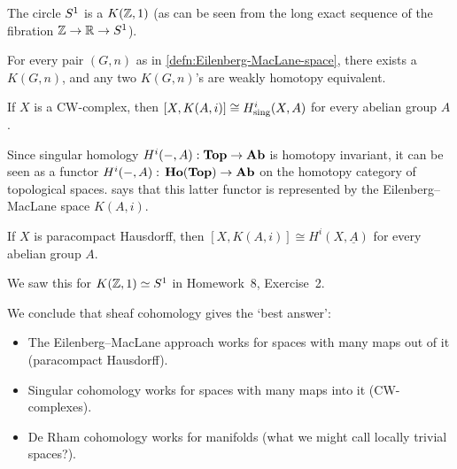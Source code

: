 \begin{exmp}
The circle \(\sphere[1]\) is a \(K(\mathbb{Z},1)\) (as can be seen from the long exact sequence of the fibration \(\bb Z\to\bb R\to\sphere[1]\)).
\end{exmp}

\begin{thm}[name={\cite[Proposition~4.30]{hatcherAlgebraicTopology2002}}]
For every pair \((G,n)\) as in \cref{defn:Eilenberg-MacLane-space}, there exists a \(K(G,n)\), and any two \(K(G,n)\)'s are weakly homotopy equivalent.
\end{thm}

\begin{prop}[name={representability of singular cohomology~\cite[Theorem 4.57]{hatcherAlgebraicTopology2002}}]\label{prop:representability-of-singular-cohomology}
If \(X\) is a CW-complex, then \([X,K(A,i)]\cong H^i_{\smash{\textup{sing}}}(X,A)\) for every abelian group \(A\).
\end{prop}

\begin{rmk}
Since singular homology \(H^i(-,A)\colon\catTopologicalSpace\to\catAbelianGroup\) is homotopy invariant, it can be seen as a functor \(H^i(-,A)\colon\catHomotopy(\catTopologicalSpace)\to\catAbelianGroup\) on the homotopy category of topological spaces.
 says that this latter functor is represented by the Eilenberg--MacLane space \(K(A,i)\).
\end{rmk}

\begin{prop}\label{prop:comparison-sheaf-cohomology-Eilenberg-MacLane}
If \(X\) is paracompact Hausdorff, then \([X,K(A,i)]\cong H^i(X,\underline{A})\) for every abelian group \(A\).
\end{prop}
We saw this for \(K(\bb Z,1)\simeq\sphere[1]\) in Homework~8, Exercise~2.


We conclude that sheaf cohomology gives the `best answer':
\begin{itemize}
\item The Eilenberg--MacLane approach works for spaces with many maps out of it (paracompact Hausdorff).
\item Singular cohomology works for spaces with many maps into it (CW-complexes).
\item De Rham cohomology works for manifolds (what we might call locally trivial spaces?).
\end{itemize}

